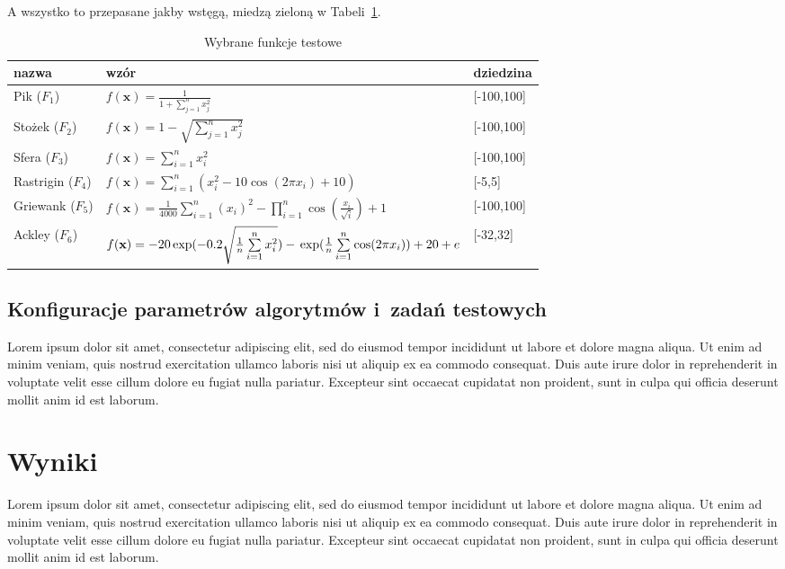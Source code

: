 \documentclass[final,a4paper,openany,12pt]{mwbk}
\begin{document}
A wszystko to przepasane jakby wstęgą, miedzą zieloną w Tabeli~\ref{TabComp}.

\begin{table}
\centering
\caption{Wybrane funkcje testowe}\label{TabComp}
{\renewcommand{\arraystretch}{1.5}
\begin{tabular}{p{3cm}p{9cm}p{2cm}}\hline\hline
nazwa & wzór	& dziedzina\\ \hline\hline
Pik ($F_1$)	&	$f(\textbf{x})=\frac{1}{1 + \sum_{j = 1}^{n}x_j^2}$	&	[-100,100]\\
Stożek ($F_2$)	&	$f(\textbf{x})=1 - \sqrt{\sum_{j = 1}^{n}x_j^2}$	&	[-100,100]\\
Sfera ($F_3$)	&	$f(\textbf{x})=\sum_{i=1}^n{x_i^2}$	&	[-100,100]\\
Rastrigin ($F_4$)	&	$f(\textbf{x})=\sum_{i=1}^n{(x_i^2-10\cos(2\pi x_i)+10)}$	&	[-5,5]\\
Griewank ($F_5$)	&	$f(\textbf{x})=\frac{1}{4000}\sum_{i=1}^n{\!(x_i)^2}-
 \prod_{i=1}^{n}\!\cos(\frac{x_i}{\sqrt{i}})+1$	&	[-100,100]\\
Ackley ($F_6$)	&	$f(\textbf{x})=-20\exp(-0.2\sqrt{\frac{1}{n}\sum\limits_{i=1}^{n}{x_i^2}})-\newline
 \exp(\frac{1}{n}\sum\limits_{i=1}^{n}{\cos(2\pi x_i)})+20+e$	&	[-32,32]\\
\hline \hline
\end{tabular}
}
\end{table}


\section{Konfiguracje parametrów algorytmów i~zadań testowych}

Lorem ipsum dolor sit amet, consectetur adipiscing elit, sed do eiusmod tempor incididunt ut labore et dolore magna aliqua. Ut enim ad minim veniam, quis nostrud exercitation ullamco laboris nisi ut aliquip ex ea commodo consequat. Duis aute irure dolor in reprehenderit in voluptate velit esse cillum dolore eu fugiat nulla pariatur. Excepteur sint occaecat cupidatat non proident, sunt in culpa qui officia deserunt mollit anim id est laborum.

\chapter{Wyniki}

Lorem ipsum dolor sit amet, consectetur adipiscing elit, sed do eiusmod tempor incididunt ut labore et dolore magna aliqua. Ut enim ad minim veniam, quis nostrud exercitation ullamco laboris nisi ut aliquip ex ea commodo consequat. Duis aute irure dolor in reprehenderit in voluptate velit esse cillum dolore eu fugiat nulla pariatur. Excepteur sint occaecat cupidatat non proident, sunt in culpa qui officia deserunt mollit anim id est laborum.
\end{document}
